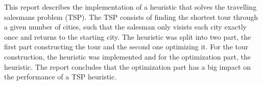 This report describes the implementation of a heuristic that solves the
travelling salesmans problem (TSP). The TSP consists of finding the shortest 
tour through a given number of cities, such that the salesman only visists each
city exactly once and returns to the starting city. 
The heuristic was split into two part, the first part constructing the tour and
the second one optimizing it. For the tour construction, the
 heuristic was implemented and for the optimization
part, the  heuristic. The report concludes that the optimization
part has a big impact on the performance of a TSP heuristic.
